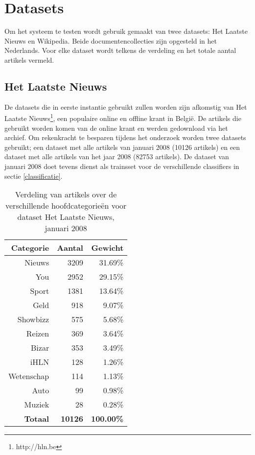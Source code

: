 \chapter{Datasets}\label{hs:datasets}
Om het systeem te testen wordt gebruik gemaakt van twee datasets: Het Laatste Nieuws en Wikipedia. Beide documentencollecties zijn opgesteld in het Nederlands. Voor elke dataset wordt telkens de verdeling en het totale aantal artikels vermeld.

\section{Het Laatste Nieuws}
De datasets die in eerste instantie gebruikt zullen worden zijn afkomstig van Het Laatste Nieuws\footnote{http://hln.be}, een populaire online en offline krant in Belgi\"e. De artikels die gebruikt worden komen van de online krant en werden gedownload via het archief. Om rekenkracht te besparen tijdens het onderzoek worden twee datasets gebruikt; een dataset met alle artikels van januari 2008 (10126 artikels) en een dataset met alle artikels van het jaar 2008 (82753 artikels). De dataset van januari 2008 doet tevens dienst als trainsset voor de verschillende classifiers in sectie \ref{classificatie}.

\begin{table}[htbp]
	\centering
	\caption{Verdeling van artikels over de verschillende hoofdcategorie\"en voor dataset Het Laatste Nieuws, januari 2008}
	\begin{tabular}{rrr}
		\toprule
		Categorie & Aantal & Gewicht \\
		\midrule
		Nieuws & 3209  & 31.69\% \\
		You   & 2952  & 29.15\% \\
		Sport & 1381  & 13.64\% \\
		Geld  & 918   & 9.07\% \\
		Showbizz & 575   & 5.68\% \\
		Reizen & 369   & 3.64\% \\
		Bizar & 353   & 3.49\% \\
		iHLN  & 128   & 1.26\% \\
		Wetenschap & 114   & 1.13\% \\
		Auto  & 99    & 0.98\% \\
		Muziek & 28    & 0.28\% \\
		\textbf{Totaal} & \textbf{10126} &\textbf{ 100.00\%} \\
		\bottomrule
	\end{tabular}%
	\label{tab:hln-2008-01-cat}%
\end{table}%

